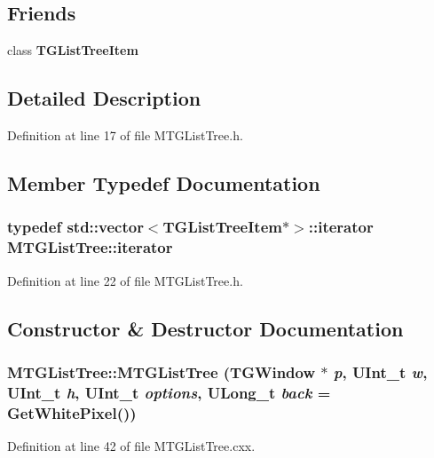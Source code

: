 \subsection*{Friends}
\begin{DoxyCompactItemize}
\item 
class {\bf TGListTreeItem}
\end{DoxyCompactItemize}


\subsection{Detailed Description}


Definition at line 17 of file MTGListTree.h.

\subsection{Member Typedef Documentation}
\subsubsection[{iterator}]{\setlength{\rightskip}{0pt plus 5cm}typedef std::vector$<$TGListTreeItem$\ast$$>$::{\bf iterator} {\bf MTGListTree::iterator}\hspace{0.3cm}{\ttfamily  [private]}}\label{classMTGListTree_a5d149669aa7aa7a9250cd204768d9129}


Definition at line 22 of file MTGListTree.h.

\subsection{Constructor \& Destructor Documentation}
\subsubsection[{MTGListTree}]{\setlength{\rightskip}{0pt plus 5cm}MTGListTree::MTGListTree (TGWindow $\ast$ {\em p}, \/  UInt\_\-t {\em w}, \/  UInt\_\-t {\em h}, \/  UInt\_\-t {\em options}, \/  ULong\_\-t {\em back} = {\ttfamily GetWhitePixel()})}\label{classMTGListTree_ad8ac02718266588f1851521765feb9b7}


Definition at line 42 of file MTGListTree.cxx.
